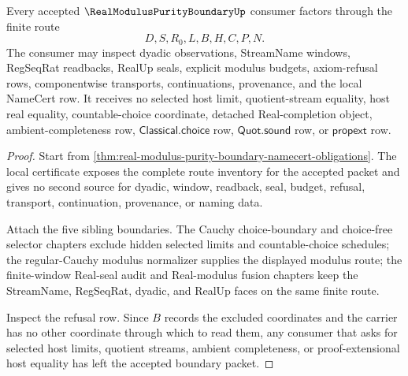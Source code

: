\begin{theorem}
\label{thm:real-modulus-purity-boundary-nonescape}
Every accepted $\RealModulusPurityBoundaryUp$ consumer factors through the finite route
$$
D,S,R_0,L,B,H,C,P,N.
$$
The consumer may inspect dyadic observations, StreamName windows, RegSeqRat readbacks, RealUp seals, explicit modulus budgets, axiom-refusal rows, componentwise transports, continuations, provenance, and the local NameCert row. It receives no selected host limit, quotient-stream equality, host real equality, countable-choice coordinate, detached Real-completion object, ambient-completeness row, $\mathsf{Classical.choice}$ row, $\mathsf{Quot.sound}$ row, or $\mathsf{propext}$ row.
\end{theorem}
\begin{proof}
Start from \autoref{thm:real-modulus-purity-boundary-namecert-obligations}. The local certificate exposes the complete route inventory for the accepted packet and gives no second source for dyadic, window, readback, seal, budget, refusal, transport, continuation, provenance, or naming data.

Attach the five sibling boundaries. The Cauchy choice-boundary and choice-free selector chapters exclude hidden selected limits and countable-choice schedules; the regular-Cauchy modulus normalizer supplies the displayed modulus route; the finite-window Real-seal audit and Real-modulus fusion chapters keep the StreamName, RegSeqRat, dyadic, and RealUp faces on the same finite route.

Inspect the refusal row. Since $B$ records the excluded coordinates and the carrier has no other coordinate through which to read them, any consumer that asks for selected host limits, quotient streams, ambient completeness, or proof-extensional host equality has left the accepted boundary packet.
\end{proof}

